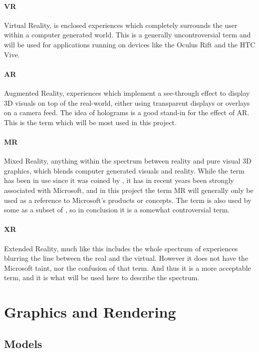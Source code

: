 \paragraph*{VR}\label{para:vr} Virtual Reality, is enclosed experiences which completely surrounds the user within a computer generated world. This is a generally uncontroversial term and will be used for applications running on devices like the Oculus Rift and the HTC Vive.

\paragraph*{AR}\label{para:ar} Augmented Reality, experiences which implement a see-through effect to display 3D visuals on top of the real-world, either using transparent displays or overlays on a camera feed. The idea of holograms is a good stand-in for the effect of AR. This is the term which will be most used in this project. 

\paragraph*{MR}\label{para:mr} Mixed Reality, anything within the spectrum between reality and pure visual 3D graphics, which blends computer generated visuals and reality. While the term has been in use since it was coined by \citet{Milgram1994}, it has in recent years been strongly associated with Microsoft, and in this project the term MR will generally only be used as a reference to Microsoft's products or concepts. The term is also used by some as a subset of , so in conclusion it is a somewhat controversial term. 


\paragraph*{XR}\label{para:xr} Extended Reality, much like  this includes the whole spectrum of experiences blurring the line between the real and the virtual. However it does not have the Microsoft taint, nor the confusion of that term. And thus it is a more acceptable term, and it is what will be used here to describe the spectrum.


\section{Graphics and Rendering}

\subsection*{Models}

